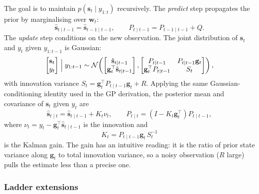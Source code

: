 \documentclass{article}
\begin{document}
The goal is to maintain $p(\mathbf{s}_t \mid y_{1:t})$ recursively. The \textit{predict} step propagates the prior by marginalising over $\mathbf{w}_t$:
\begin{equation}
\hat{\mathbf{s}}_{t \mid t-1} = \hat{\mathbf{s}}_{t-1 \mid t-1}, \qquad P_{t \mid t-1} = P_{t-1 \mid t-1} + Q.
\label{eq:kf-predict}
\end{equation}
The \textit{update} step conditions on the new observation. The joint distribution of $\mathbf{s}_t$ and $y_t$ given $y_{1:t-1}$ is Gaussian:
\begin{equation}
\begin{bmatrix} \mathbf{s}_t \\ y_t \end{bmatrix} \Bigm| y_{1:t-1} \sim \mathcal{N}\!\left(\begin{bmatrix} \hat{\mathbf{s}}_{t \mid t-1} \\ \mathbf{g}_t^\top \hat{\mathbf{s}}_{t \mid t-1} \end{bmatrix}, \begin{bmatrix} P_{t \mid t-1} & P_{t \mid t-1} \mathbf{g}_t \\ \mathbf{g}_t^\top P_{t \mid t-1} & S_t \end{bmatrix}\right),
\label{eq:kf-joint}
\end{equation}
with innovation variance $S_t = \mathbf{g}_t^\top P_{t \mid t-1} \mathbf{g}_t + R$. Applying the same Gaussian-conditioning identity used in the GP derivation, the posterior mean and covariance of $\mathbf{s}_t$ given $y_t$ are
\begin{equation}
\hat{\mathbf{s}}_{t \mid t} = \hat{\mathbf{s}}_{t \mid t-1} + K_t \nu_t, \qquad P_{t \mid t} = (I - K_t \mathbf{g}_t^\top) P_{t \mid t-1},
\label{eq:kf-update}
\end{equation}
where $\nu_t = y_t - \mathbf{g}_t^\top \hat{\mathbf{s}}_{t \mid t-1}$ is the innovation and
\begin{equation}
K_t = P_{t \mid t-1} \mathbf{g}_t \, S_t^{-1}
\label{eq:kalman-gain}
\end{equation}
is the Kalman gain. The gain has an intuitive reading: it is the ratio of prior state variance along $\mathbf{g}_t$ to total innovation variance, so a noisy observation ($R$ large) pulls the estimate less than a precise one.

\subsubsection*{Ladder extensions}
\end{document}
